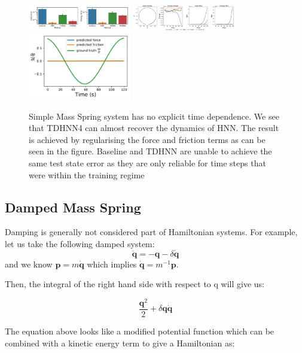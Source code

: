 \documentclass[twoside]{article}
\begin{document}
\begin{figure}[h!]
\centering
\includegraphics[width=0.4\textwidth]{figures/mass_spring_errors.pdf}
\includegraphics[width=0.4\textwidth]{figures/mass_spring_long.pdf}
\includegraphics[width=0.4\textwidth]{figures/mass_spring_pred_force.pdf}
\caption{Simple Mass Spring system has no explicit time dependence. We see that TDHNN4 can almost recover the dynamics of HNN. The result is achieved by regularising the force and friction terms as can be seen in the figure. Baseline and TDHNN are unable to achieve the same test state error as they are only reliable for time steps that were within the training regime}
\label{mspring}
\end{figure}


\subsection{Damped Mass Spring}

Damping is generally not considered part of Hamiltonian systems. For example, let us take the following damped system:
\begin{equation}
\ddot{\mathbf{q}} = -\mathbf{q} - \delta\dot{\mathbf{q}}
\end{equation}
and we know $\mathbf{p}=m\dot{\mathbf{q}}$ which implies $\dot{\mathbf{q}} = m^{-1}\mathbf{p}$.

Then, the integral of the right hand side with respect to q will give us:

\begin{equation}
\frac{\mathbf{q}^2}{2} + \delta \mathbf{q} \dot{\mathbf{q}}
\end{equation}

The equation above looks like a modified potential function which can be combined with a kinetic energy term to give a Hamiltonian as:
\end{document}

